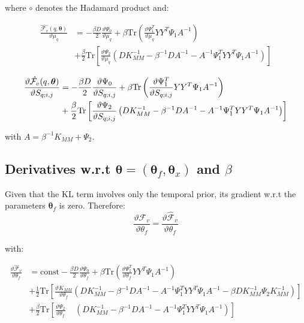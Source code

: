 where $\circ$ denotes the Hadamard product and:

\begin{align}
 \frac{\hat{\mathcal{F}_v}(q, \boldsymbol \theta)}{\vartheta \mu_q}
{}& = - \frac{\beta D}{2} \frac{\vartheta \Psi_0}{\vartheta \mu_q}
    + \beta \text{Tr} \left(\frac{\vartheta \Psi_1^T}{\vartheta \mu_q} Y Y^T \Psi_1 A^{-1} \right) \nonumber \\
{}& + \frac{\beta}{2} \text{Tr} \left[ \frac{\vartheta \Psi_2}{\vartheta \mu_q}
       \left(
	  D K_{MM}^{-1} - \beta^{-1} D A^{-1} - A^{-1} \Psi_1^T Y Y^T \Psi_1 A^{-1}
       \right) \right] \label{derivFTildeEfficientComputationMu}
\end{align}


\begin{align}
 \frac{\vartheta \hat{\mathcal{F}_v}(q, \boldsymbol \theta)}{\vartheta S_{q;i,j}}
{}& = - \frac{\beta D}{2} \frac{\vartheta \Psi_0}{\vartheta S_{q;i,j}}
    + \beta \text{Tr} \left(\frac{\vartheta \Psi_1^T}{\vartheta S_{q;i,j}} Y Y^T \Psi_1 A^{-1} \right) \nonumber \\
{}& + \frac{\beta}{2} \text{Tr} \left[ \frac{\vartheta \Psi_2}{\vartheta S_{q;i,j}}
       \left(
	  D K_{MM}^{-1} - \beta^{-1} D A^{-1} - A^{-1} \Psi_1^T Y Y^T \Psi_1 A^{-1}
       \right) \right] \label{derivFTildeEfficientComputationS}
\end{align}


with $A=\beta^{-1}K_{MM}+\Psi_2$.





\subsection{Derivatives w.r.t $\boldsymbol \theta = (\boldsymbol \theta_f, \boldsymbol \theta_x)$ and $\beta$}
Given that the KL term involves only the temporal prior, its gradient w.r.t the parameters $\boldsymbol \theta_f$ is zero. Therefore:
\begin{equation}
   \label{DerivativeOfFComplete}
      \frac{\vartheta \mathcal{F}_v}{\vartheta \theta_f} = \frac{\vartheta \hat{\mathcal{F}}_v}{\vartheta \theta_f}
\end{equation}

  with:

\begin{align}
\frac{\vartheta \hat{\mathcal{F}}_v}{\vartheta \theta_f} {}& = \text{const} - 
\frac{\beta D}{2} \frac{\vartheta \Psi_0}{\vartheta \theta_f}
 + \beta \text{Tr} \left(\frac{\vartheta \Psi_1^T}{\vartheta \theta_f} Y Y^T \Psi_1 A^{-1} \right) \nonumber \\
{}& + \frac{1}{2} \text{Tr} \left[ \frac{\vartheta K_{MM}}{\vartheta \theta_f}
        \left(
	   D K_{MM}^{-1} - \beta^{-1} D A^{-1} - A^{-1} \Psi_1^T Y Y^T \Psi_1 A^{-1} - \beta D K_{MM}^{-1} \Psi_2 K_{MM}^{-1} 
         \right) \right] \nonumber \\
{}& + \frac{\beta}{2} \text{Tr} \left[ \frac{\vartheta \Psi_2}{\vartheta \theta_f} \;\;\;\;
       \left(
	  D K_{MM}^{-1} - \beta^{-1} D A^{-1} - A^{-1} \Psi_1^T Y Y^T \Psi_1 A^{-1}
       \right) \right] \label{DerivativeOfFtildeComplete}
\end{align}

